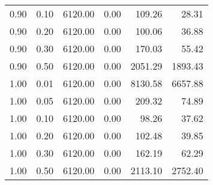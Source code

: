 \begin{table}
\begin{tabular}{rrrrrr}
0.90 & 0.10 & 6120.00 & 0.00 & 109.26 & 28.31 \\
0.90 & 0.20 & 6120.00 & 0.00 & 100.06 & 36.88 \\
0.90 & 0.30 & 6120.00 & 0.00 & 170.03 & 55.42 \\
0.90 & 0.50 & 6120.00 & 0.00 & 2051.29 & 1893.43 \\
1.00 & 0.01 & 6120.00 & 0.00 & 8130.58 & 6657.88 \\
1.00 & 0.05 & 6120.00 & 0.00 & 209.32 & 74.89 \\
1.00 & 0.10 & 6120.00 & 0.00 & 98.26 & 37.62 \\
1.00 & 0.20 & 6120.00 & 0.00 & 102.48 & 39.85 \\
1.00 & 0.30 & 6120.00 & 0.00 & 162.19 & 62.29 \\
1.00 & 0.50 & 6120.00 & 0.00 & 2113.10 & 2752.40 \\
\bottomrule
\end{tabular}
\end{table}
